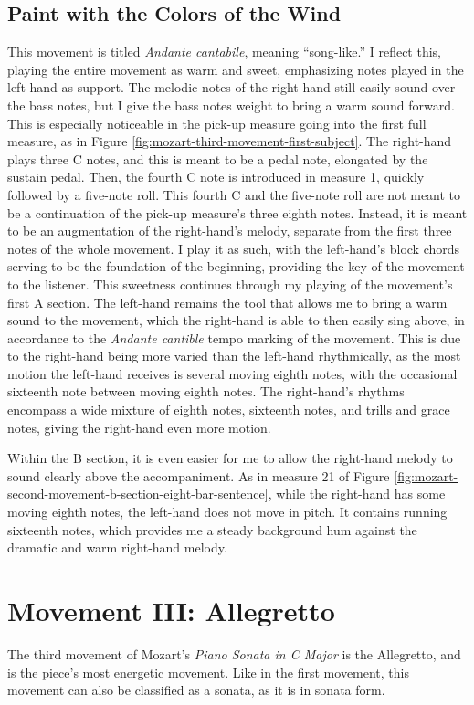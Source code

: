 \subsection{Paint with the Colors of the Wind}

This movement is titled \textit{Andante cantabile}, meaning ``song-like.'' I reflect this, playing the entire movement as warm and sweet, emphasizing notes played in the left-hand as support. The melodic notes of the right-hand still easily sound over the bass notes, but I give the bass notes weight to bring a warm sound forward. This is especially noticeable in the pick-up measure going into the first full measure, as in Figure \ref{fig:mozart-third-movement-first-subject}.\autocite{Henle_1977} The right-hand plays three C notes, and this is meant to be a pedal note, elongated by the sustain pedal. Then, the fourth C note is introduced in measure 1, quickly followed by a five-note roll. This fourth C and the five-note roll are not meant to be a continuation of the pick-up measure's three eighth notes. Instead, it is meant to be an augmentation of the right-hand's melody, separate from the first three notes of the whole movement. I play it as such, with the left-hand's block chords serving to be the foundation of the beginning, providing the key of the movement to the listener. This sweetness continues through my playing of the movement's first A section. The left-hand remains the tool that allows me to bring a warm sound to the movement, which the right-hand is able to then easily sing above, in accordance to the \textit{Andante cantible} tempo marking of the movement. This is due to the right-hand being more varied than the left-hand rhythmically, as the most motion the left-hand receives is several moving eighth notes, with the occasional sixteenth note between moving eighth notes. The right-hand's rhythms encompass a wide mixture of eighth notes, sixteenth notes, and trills and grace notes, giving the right-hand even more motion. 

Within the B section, it is even easier for me to allow the right-hand melody to sound clearly above the accompaniment. As in measure 21 of Figure \ref{fig:mozart-second-movement-b-section-eight-bar-sentence}\autocite{Henle_1977}, while the right-hand has some moving eighth notes, the left-hand does not move in pitch. It contains running sixteenth notes, which provides me a steady background hum against the dramatic and warm right-hand melody. 

\section{Movement III: Allegretto}
The third movement of Mozart's \textit{Piano Sonata in C Major} is the Allegretto, and is the piece's most energetic movement. Like in the first movement, this movement can also be classified as a sonata, as it is in sonata form. 

